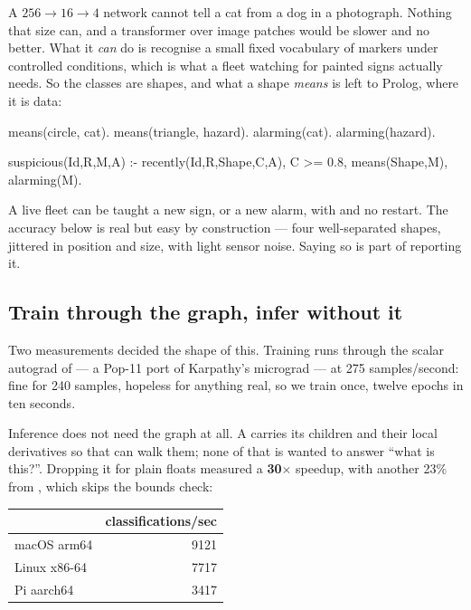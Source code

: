 A $256 \rightarrow 16 \rightarrow 4$ network cannot tell a cat from a dog in
a photograph. Nothing that size can, and a transformer over image patches
would be slower and no better. What it \emph{can} do is recognise a small
fixed vocabulary of markers under controlled conditions, which is what a
fleet watching for painted signs actually needs. So the classes are shapes,
and what a shape \emph{means} is left to Prolog, where it is data:

\begin{pop}
means(circle, cat).      means(triangle, hazard).
alarming(cat).           alarming(hazard).

suspicious(Id,R,M,A) :- recently(Id,R,Shape,C,A), C >= 0.8,
                        means(Shape,M), alarming(M).
\end{pop}

\noindent A live fleet can be taught a new sign, or a new alarm, with
 and no restart. The accuracy below is real but easy by
construction --- four well-separated shapes, jittered in position and size,
with light sensor noise. Saying so is part of reporting it.

\subsection{Train through the graph, infer without it}

Two measurements decided the shape of this. Training runs through the scalar
autograd of  --- a Pop-11 port of
Karpathy's micrograd --- at 275 samples/second: fine for 240 samples,
hopeless for anything real, so we train once, twelve epochs in ten seconds.

Inference does not need the graph at all. A  carries its
children and their local derivatives so that  can walk
them; none of that is wanted to answer ``what is this?''. Dropping it for
plain floats measured a \textbf{30$\times$} speedup, with another 23\% from
, which skips the bounds check:

\begin{center}
\footnotesize
\begin{tabular}{lr}
\toprule
 & \textbf{classifications/sec}\\
\midrule
macOS arm64   & 9121\\
Linux x86-64  & 7717\\
Pi aarch64    & 3417\\
\bottomrule
\end{tabular}
\end{center}

